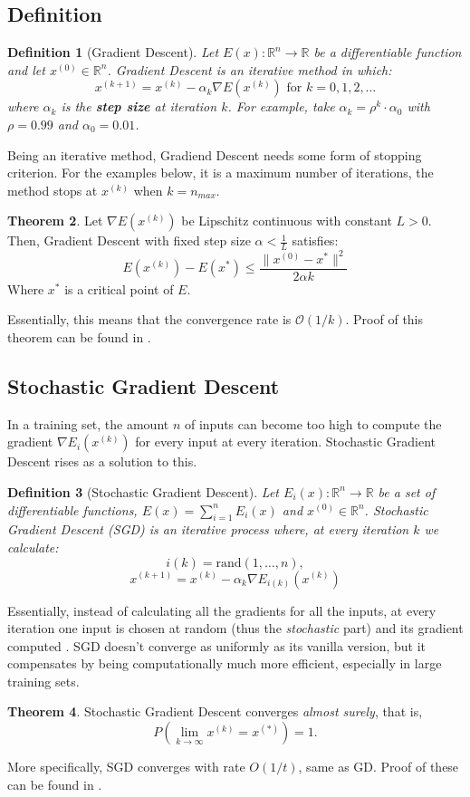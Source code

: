 \documentclass[titlepage]{article}
\theoremstyle{plain}
\newtheorem{definition}{Definition}[section]
\theoremstyle{definition}
\newtheorem{theorem}[definition]{Theorem}
\begin{document}
		\subsection{Definition}
		\begin{definition}[Gradient Descent]
			Let $E(x): \mathbb{R}^n \to \mathbb{R}$ be a differentiable function and let $x^{(0)} \in \mathbb{R}^n$. Gradient Descent is an iterative method in which:
			$$
				x^{(k+1)} = x^{(k)} - \alpha_k \nabla E(x^{(k)}) \text{ for } k=0,1,2,\ldots
			$$
			where $\alpha_k$ is the {\bf step size} at iteration $k$. For example, take $\alpha_k = \rho^k \cdot \alpha_0$ with $\rho = 0.99$ and $\alpha_0 = 0.01$.
		\end{definition}
		Being an iterative method, Gradiend Descent needs some form of stopping criterion. For the examples below, it is a maximum number of iterations, the method stops at $x^{(k)}$ when $k = n_{max}$.
		\begin{theorem}
			Let $\nabla E(x^{(k)})$ be Lipschitz continuous with constant $L>0$. Then, Gradient Descent with fixed step size $\alpha < \frac{1}{L}$ satisfies:
			$$
			E(x^{(k)}) - E(x^{\ast}) \leq \frac{\|x^{(0)} - x^{\ast} \|^2}{2\alpha k}
			$$
			Where $x^{\ast}$ is a critical point of $E$.
		\end{theorem}
		Essentially, this means that the convergence rate is $\mathcal{O}(1/k)$. Proof of this theorem can be found in \cite{Gordon}.
		
		\subsection{Stochastic Gradient Descent}\label{sgdDef}
		
		In a training set, the amount $n$ of inputs can become too high to compute the gradient $\nabla E_i(x^{(k)})$ for every input at every iteration. Stochastic Gradient Descent rises as a solution to this.
		\begin{definition}[Stochastic Gradient Descent]
			Let $E_{i}(x): \mathbb{R}^n \to \mathbb{R}$ be a set of differentiable functions, $E(x) = \sum_{i=1}^n E_i(x)$ and $x^{(0)} \in \mathbb{R}^n$. Stochastic Gradient Descent (SGD) is an iterative process where, at every iteration $k$ we calculate:
			$$
			i(k) = \text{rand}(1,\dots,n),
			$$ $$
			x^{(k+1)} =  x^{(k)} - \alpha_k \nabla E_{i(k)}(x^{(k)})
			$$
		\end{definition}
		Essentially, instead of calculating all the gradients for all the inputs, at every iteration one input is chosen at random (thus the \textit{stochastic} part) and its gradient computed \cite{Ruder}. SGD doesn't converge as uniformly as its vanilla version, but it compensates by being computationally much more efficient, especially in large training sets.\\
		\begin{theorem}
			Stochastic Gradient Descent converges \textit{almost surely}, that is,
			$$
			P(\lim_{k\to\infty}x^{(k)}=x^{(\ast)}) = 1.
			$$
		\end{theorem}
		More specifically, SGD converges with rate $O(1/t)$, same as GD. Proof of these can be found in \cite{Nemirovski,Powell}.\\
		
\end{document}
